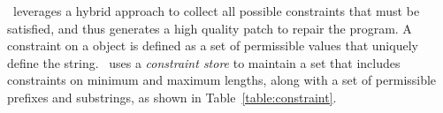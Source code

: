  \tool\ leverages a hybrid
approach to collect all possible constraints that must be satisfied, and thus
generates a high quality patch to repair the program. A constraint on a
 object is defined as a set of permissible values that uniquely
define the string. \tool\ uses a \textit{constraint store} to maintain a set that 
includes constraints on minimum and maximum
lengths, along with a set of permissible prefixes and substrings, as shown in
Table~\ref{table:constraint}.

